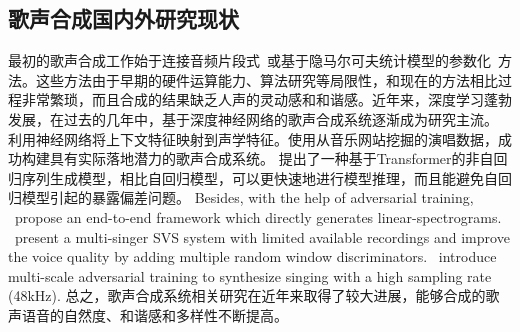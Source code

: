 \subsection{歌声合成国内外研究现状}
最初的歌声合成工作始于连接音频片段式~\citep{macon1997concatenation,kenmochi2007vocaloid}或基于隐马尔可夫统计模型的参数化~\citep{saino2006hmm,oura2010recent}方法。这些方法由于早期的硬件运算能力、算法研究等局限性，和现在的方法相比过程非常繁琐，而且合成的结果缺乏人声的灵动感和和谐感。近年来，深度学习蓬勃发展，在过去的几年中，基于深度神经网络的歌声合成系统逐渐成为研究主流。
利用神经网络将上下文特征映射到声学特征。\citet{ren2020deepsinger}使用从音乐网站挖掘的演唱数据，成功构建具有实际落地潜力的歌声合成系统。\citet{blaauw2020sequence} 提出了一种基于Transformer的非自回归序列生成模型，相比自回归模型，可以更快速地进行模型推理，而且能避免自回归模型引起的暴露偏差问题。 Besides,
with the help of adversarial training, \citet{lee2019adversarially}~propose an end-to-end framework which directly generates linear-spectrograms. \citet{wu2020adversarially}~present a multi-singer SVS system with limited available recordings and improve the voice quality by adding multiple random window discriminators. \citet{chen2020hifisinger}~introduce multi-scale adversarial training to synthesize singing with a high sampling rate (48kHz). 总之，歌声合成系统相关研究在近年来取得了较大进展，能够合成的歌声语音的自然度、和谐感和多样性不断提高。
